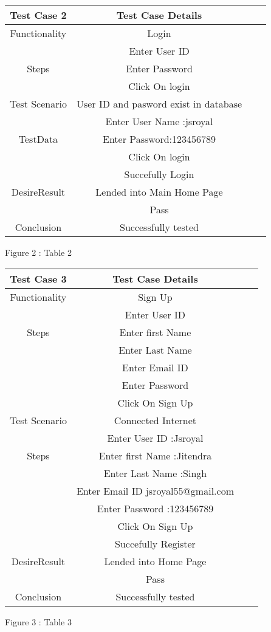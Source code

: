 \documentclass[]{article}
\begin{document}
\begin{center}
\begin{tabular}{ |c|c|c|c|}
\hline
Test Case 2 & Test Case Details     \hspace{4cm} \\ 
\hline
 Functionality & Login \\ 
\hline
\multirow{3}{4em}{Steps} & Enter User ID  \\ 
& Enter Password \\ 
& Click On login \\ 
\hline
Test Scenario & User ID and pasword exist in database \\
\hline
\multirow{3}{4em}{TestData} & Enter User Name :jsroyal  \\ 
& Enter Password:123456789\\ 
& Click On login \\ 
\hline
\multirow{3}{4em}{DesireResult} & Succefully Login  \\ 
& Lended into Main Home Page\\  
\hline
Test case &  Pass \\
\hline
Conclusion & Successfully tested \\
\hline
\end{tabular}
\end{center}
\hspace{3.5cm} Figure 2 : Table 2



\begin{center}
\begin{tabular}{ |c|c|c|c| }
\hline
Test Case 3 & Test Case Details  \hspace{4cm} \\ 
\hline
 Functionality & Sign Up  \\ 
\hline
\multirow{3}{4em}{Steps} & Enter User ID  \\
& Enter first Name \\
& Enter Last Name \\ 
& Enter Email ID \\
& Enter Password \\
& Click On Sign Up \\ 
\hline
Test Scenario & Connected Internet \\
\hline
\multirow{3}{4em}{Steps} & Enter User ID :Jsroyal  \\
& Enter first Name :Jitendra\\
& Enter Last Name :Singh \\ 
& Enter Email ID  jsroyal55@gmail.com\\
& Enter Password :123456789\\
& Click On Sign Up \\ 
\hline
\multirow{3}{4em}{DesireResult} & Succefully Register   \\ 
& Lended into Home Page\\ 
\hline
Test case &  Pass \\
\hline
Conclusion & Successfully tested \\
\hline
\end{tabular}
\end{center}
\hspace{3.5cm} Figure 3 : Table 3
\end{document}
